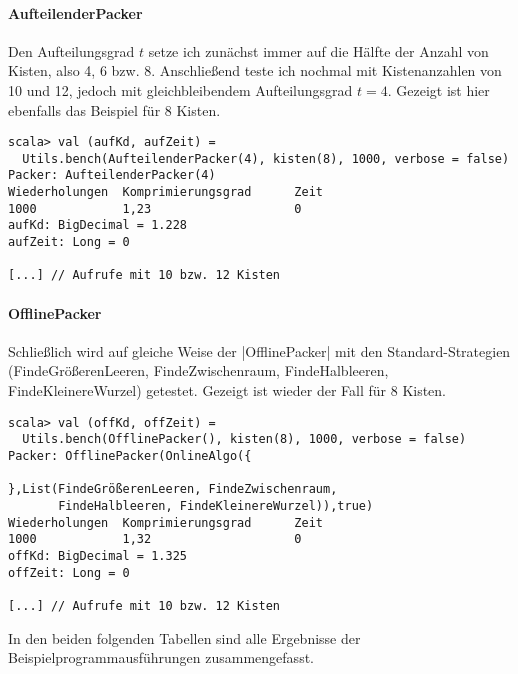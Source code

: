 \paragraph{AufteilenderPacker}
Den Aufteilungsgrad $t$ setze ich zunächst immer auf die Hälfte der Anzahl von Kisten, also 4, 6 bzw. 8.
Anschließend teste ich nochmal mit Kistenanzahlen von 10 und 12, jedoch mit gleichbleibendem Aufteilungsgrad $t = 4$.
Gezeigt ist hier ebenfalls das Beispiel für 8 Kisten.
\begin{lstlisting}
scala> val (aufKd, aufZeit) =
  Utils.bench(AufteilenderPacker(4), kisten(8), 1000, verbose = false)
Packer: AufteilenderPacker(4)
Wiederholungen  Komprimierungsgrad      Zeit
1000            1,23                    0
aufKd: BigDecimal = 1.228
aufZeit: Long = 0

[...] // Aufrufe mit 10 bzw. 12 Kisten
\end{lstlisting}

\paragraph{OfflinePacker}
Schließlich wird auf gleiche Weise der |OfflinePacker| mit den Standard-Strategien (FindeGrößerenLeeren, FindeZwischenraum, FindeHalbleeren, FindeKleinereWurzel) getestet. Gezeigt ist wieder der Fall für 8 Kisten.
\begin{lstlisting}
scala> val (offKd, offZeit) =
  Utils.bench(OfflinePacker(), kisten(8), 1000, verbose = false)
Packer: OfflinePacker(OnlineAlgo({

},List(FindeGrößerenLeeren, FindeZwischenraum,
       FindeHalbleeren, FindeKleinereWurzel)),true)
Wiederholungen  Komprimierungsgrad      Zeit
1000            1,32                    0
offKd: BigDecimal = 1.325
offZeit: Long = 0

[...] // Aufrufe mit 10 bzw. 12 Kisten
\end{lstlisting}
In den beiden folgenden Tabellen sind alle Ergebnisse der Beispielprogrammausführungen zusammengefasst.
